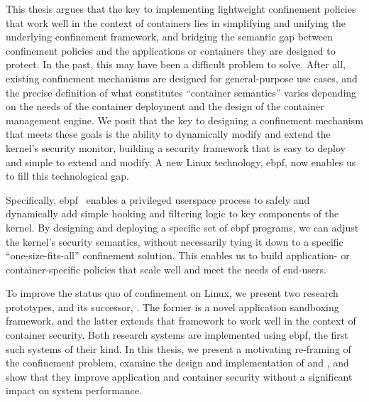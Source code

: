 This thesis argues that the key to implementing lightweight confinement policies that
work well in the context of containers lies in simplifying and unifying the underlying
confinement framework, and bridging the semantic gap between confinement policies and the
applications or containers they are designed to protect. In the past, this may have been
a difficult problem to solve. After all, existing confinement mechanisms are designed for
general-purpose use cases, and the precise definition of what constitutes
\enquote{container semantics} varies depending on the needs of the container deployment
and the design of the container management engine. We posit that the key to designing
a confinement mechanism that meets these goals is the ability to dynamically modify and
extend the kernel's security monitor, building a security framework that is easy to deploy
and simple to extend and modify. A new Linux technology, \gls{ebpf}, now enables us to
fill this technological gap.

Specifically, \gls{ebpf}~\cite{gregg2019_bpf, starovoitov2014_ebpf} enables a privileged
userspace process to safely and dynamically add simple hooking and filtering logic to key
components of the kernel. By designing and deploying a specific set of \gls{ebpf}
programs, we can adjust the kernel's security semantics, without necessarily tying it down
to a specific \enquote{one-size-fits-all} confinement solution. This enables us to build
application- or container-specific policies that scale well and meet the needs of
end-users.

To improve the status quo of confinement on Linux, we present two research prototypes,
\bpfbox{} and its successor, \bpfcontain{}. The former is a novel application sandboxing
framework, and the latter extends that framework to work well in the context of container
security. Both research systems are implemented using \gls{ebpf}, the first such systems
of their kind. In this thesis, we present a motivating re-framing of the confinement
problem, examine the design and implementation of \bpfbox{} and \bpfcontain{}, and show
that they improve application and container security without a significant impact on
system performance.


